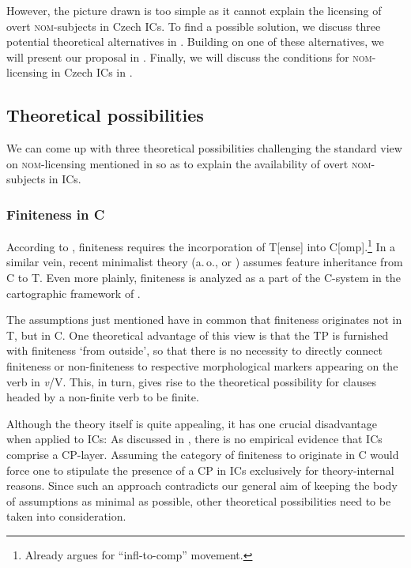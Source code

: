 \documentclass[output=paper,colorlinks,citecolor=brown,
modfonts,newtxmath
]{langscibook}
\begin{document}
\noindent However, the picture drawn is too simple as it cannot explain the licensing of overt \textsc{nom}-subjects in Czech ICs. To find a possible solution, we discuss three potential theoretical alternatives in . Building on one of these alternatives, we will present our proposal in . Finally, we will discuss the conditions for \textsc{nom}-licensing in Czech ICs in .


\subsection{Theoretical possibilities}\label{sec:nom_possibilities}

We can come up with three theoretical possibilities challenging the standard view on \textsc{nom}-licensing mentioned in  so as to explain the availability of overt \textsc{nom}-subjects in ICs.

\subsubsection{Finiteness in C}\label{sec:nom_possibilities_1}

According to \citet{Kayne1994}, finiteness requires the incorporation of T[ense] into C[omp].\footnote{Already \citet{Raposo1987} argues for ``infl-to-comp'' movement.} In a similar vein, recent minimalist theory (a.\,o., \citealt{Chomsky2007} or \citealt{Richards2007}) assumes feature inheritance from C to T. Even more plainly, finite\-ness is analyzed as a part of the C-system in the cartographic framework of \citet{Rizzi1997}. 

The assumptions just mentioned have in common that finiteness originates not in T, but in C. One theoretical advantage of this view is that the TP is furnished with finiteness `from outside', so that there is no necessity to directly connect finiteness or non-finiteness to respective morphological markers appearing on the verb in \textit{v}/V. This, in turn, gives rise to the theoretical possibility for clauses headed by a non-finite verb to be finite.

Although the theory itself is quite appealing, it has one crucial disadvantage when applied to ICs: As discussed in , there is no empirical evidence that ICs comprise a CP-layer. Assuming the category of finiteness to originate in C would force one to stipulate the presence of a CP in ICs exclusively for theory-internal reasons. Since such an approach contradicts our general aim of keeping the body of assumptions as minimal as possible, other theoretical possibilities need to be taken into consideration.
\end{document}
